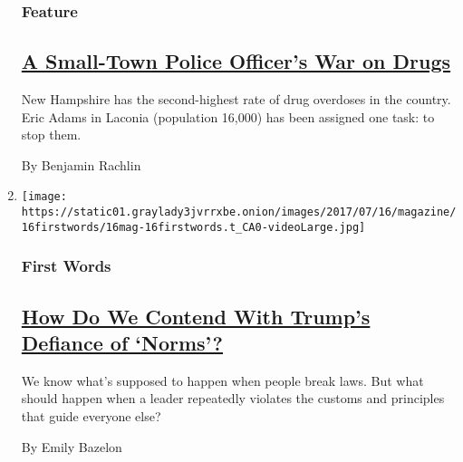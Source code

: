 \begin{enumerate}
  \hypertarget{feature-2}{%
  \subsubsection{Feature}\label{feature-2}}

  \hypertarget{a-small-town-police-officers-war-on-drugs}{%
  \subsection{\texorpdfstring{\href{/2017/07/12/magazine/a-small-town-police-officers-war-on-drugs.html}{A
  Small-Town Police Officer's War on
  Drugs}}{A Small-Town Police Officer's War on Drugs}}\label{a-small-town-police-officers-war-on-drugs}}

  New Hampshire has the second-highest rate of drug overdoses in the
  country. Eric Adams in Laconia (population 16,000) has been assigned
  one task: to stop them.

  By Benjamin Rachlin
\item
  \texttt{[image: https://static01.graylady3jvrrxbe.onion/images/2017/07/16/magazine/16firstwords/16mag-16firstwords.t\_CA0-videoLarge.jpg]}

  \hypertarget{first-words}{%
  \subsubsection{First Words}\label{first-words}}

  \hypertarget{how-do-we-contend-with-trumps-defiance-of-norms}{%
  \subsection{\texorpdfstring{\href{/2017/07/11/magazine/how-do-we-contend-with-trumps-defiance-of-norms.html}{How
  Do We Contend With Trump's Defiance of
  `Norms'?}}{How Do We Contend With Trump's Defiance of `Norms'?}}\label{how-do-we-contend-with-trumps-defiance-of-norms}}

  We know what's supposed to happen when people break laws. But what
  should happen when a leader repeatedly violates the customs and
  principles that guide everyone else?

  By Emily Bazelon
\end{enumerate}

